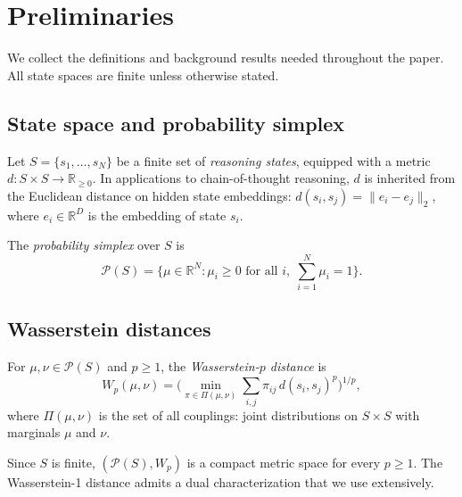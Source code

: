 \section{Preliminaries}\label{sec:prelim}

We collect the definitions and background results needed throughout the paper.
All state spaces are finite unless otherwise stated.

\subsection{State space and probability simplex}

\begin{definition}\label{def:state}
Let $S = \{s_1, \ldots, s_N\}$ be a finite set of \emph{reasoning states},
equipped with a metric $d \colon S \times S \to \mathbb{R}_{\ge 0}$.
In applications to chain-of-thought reasoning, $d$ is inherited from the
Euclidean distance on hidden state embeddings:
$d(s_i, s_j) = \|e_i - e_j\|_2$, where $e_i \in \mathbb{R}^D$ is the
embedding of state $s_i$.
\end{definition}

\begin{definition}\label{def:simplex}
The \emph{probability simplex} over $S$ is
\[
  \mathcal{P}(S) = \bigl\{ \mu \in \mathbb{R}^N : \mu_i \ge 0 \text{ for all }
  i, \; \textstyle\sum_{i=1}^N \mu_i = 1 \bigr\}.
\]
\end{definition}

\subsection{Wasserstein distances}

\begin{definition}\label{def:wasserstein}
For $\mu, \nu \in \mathcal{P}(S)$ and $p \ge 1$, the
\emph{Wasserstein-$p$ distance} is
\begin{equation}\label{eq:wasserstein}
  W_p(\mu, \nu) = \biggl( \min_{\pi \in \Pi(\mu, \nu)}
  \sum_{i,j} \pi_{ij} \, d(s_i, s_j)^p \biggr)^{1/p},
\end{equation}
where $\Pi(\mu, \nu)$ is the set of all couplings: joint distributions on
$S \times S$ with marginals $\mu$ and $\nu$.
\end{definition}

Since $S$ is finite, $(\mathcal{P}(S), W_p)$ is a compact metric space for
every $p \ge 1$. The Wasserstein-1 distance admits a dual characterization
that we use extensively.

